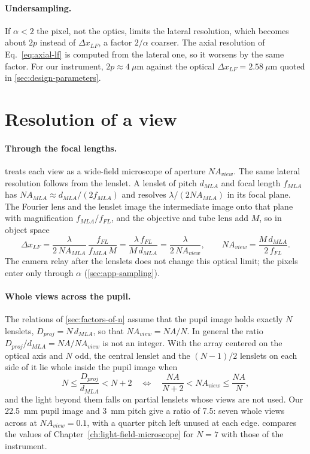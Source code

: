 \paragraph{Undersampling.} If $\alpha<2$ the pixel, not the optics, limits the lateral resolution, which becomes about $2p$ instead of $\Delta x_{LF}$, a factor $2/\alpha$ coarser. The axial resolution of Eq.~\eqref{eq:axial-lf} is computed from the lateral one, so it worsens by the same factor. For our instrument, $2p\approx4~\mu$m against the optical $\Delta x_{LF}=2.58~\mu$m quoted in \cref{sec:design-parameters}.

\section{Resolution of a view}
\label{sec:app-resolution}

\paragraph{Through the focal lengths.}  treats each view as a wide-field microscope of aperture $NA_{view}$. The same lateral resolution follows from the lenslet. A lenslet of pitch $d_{MLA}$ and focal length $f_{MLA}$ has $NA_{MLA}\approx d_{MLA}/(2f_{MLA})$ and resolves $\lambda/(2NA_{MLA})$ in its focal plane. The Fourier lens and the lenslet image the intermediate image onto that plane with magnification $f_{MLA}/f_{FL}$, and the objective and tube lens add $M$, so in object space
\begin{equation}
    \Delta x_{LF} = \frac{\lambda}{2\,NA_{MLA}}\,\frac{f_{FL}}{f_{MLA}\,M}
    = \frac{\lambda\,f_{FL}}{M\,d_{MLA}}
    = \frac{\lambda}{2\,NA_{view}}, \qquad
    NA_{view} = \frac{M\,d_{MLA}}{2\,f_{FL}}.
    \label{eq:app-lateral-focal}
\end{equation}
The camera relay after the lenslets does not change this optical limit; the pixels enter only through $\alpha$ (\cref{sec:app-sampling}).

\paragraph{Whole views across the pupil.} The relations of \cref{sec:factors-of-n} assume that the pupil image holds exactly $N$ lenslets, $D_{proj}=N\,d_{MLA}$, so that $NA_{view}=NA/N$. In general the ratio $D_{proj}/d_{MLA}=NA/NA_{view}$ is not an integer. With the array centered on the optical axis and $N$ odd, the central lenslet and the $(N-1)/2$ lenslets on each side of it lie whole inside the pupil image when
\begin{equation}
    N \le \frac{D_{proj}}{d_{MLA}} < N+2
    \quad\Longleftrightarrow\quad
    \frac{NA}{N+2} < NA_{view} \le \frac{NA}{N},
    \label{eq:app-whole-views}
\end{equation}
and the light beyond them falls on partial lenslets whose views are not used. Our 22.5~mm pupil image and 3~mm pitch give a ratio of 7.5: seven whole views across at $NA_{view}=0.1$, with a quarter pitch left unused at each edge.  compares the values of Chapter~\ref{ch:light-field-microscope} for $N=7$ with those of the instrument.


